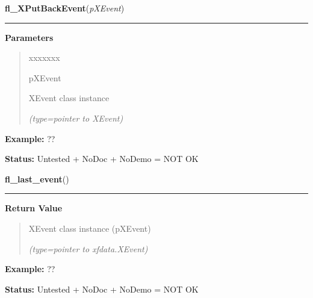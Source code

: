 \hspace{.8\funcindent}\begin{boxedminipage}{\funcwidth}

    \raggedright \textbf{fl\_XPutBackEvent}(\textit{pXEvent})

    \vspace{-1.5ex}

    \rule{\textwidth}{0.5\fboxrule}
\setlength{\parskip}{2ex}
\setlength{\parskip}{1ex}
      \textbf{Parameters}
      \vspace{-1ex}

      \begin{quote}
        \begin{Ventry}{xxxxxxx}

          \item[pXEvent]

          XEvent class instance

            {\it (type=pointer to XEvent)}

        \end{Ventry}

      \end{quote}

\textbf{Example:} ??



\textbf{Status:} Untested + NoDoc + NoDemo = NOT OK



    \end{boxedminipage}

    \label{xformslib:flxbasic:fl_last_event}

    \vspace{0.5ex}

\hspace{.8\funcindent}\begin{boxedminipage}{\funcwidth}

    \raggedright \textbf{fl\_last\_event}()

    \vspace{-1.5ex}

    \rule{\textwidth}{0.5\fboxrule}
\setlength{\parskip}{2ex}
\setlength{\parskip}{1ex}
      \textbf{Return Value}
    \vspace{-1ex}

      \begin{quote}
      XEvent class instance (pXEvent)

      {\it (type=pointer to xfdata.XEvent)}

      \end{quote}

\textbf{Example:} ??



\textbf{Status:} Untested + NoDoc + NoDemo = NOT OK



    \end{boxedminipage}

